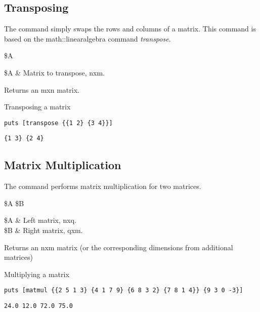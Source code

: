 \documentclass{article}
\begin{document}
\subsection{Transposing}
The command  simply swaps the rows and columns of a matrix. This command is based on the math::linearalgebra command \textit{transpose}.
\begin{syntax}
 \$A
\end{syntax}
\begin{args}
\$A & Matrix to transpose, nxm.
\end{args}
Returns an mxn matrix.
\begin{example}{Transposing a matrix}
\begin{lstlisting}
puts [transpose {{1 2} {3 4}}]
\end{lstlisting}
\tcblower
\begin{lstlisting}
{1 3} {2 4}
\end{lstlisting}
\end{example}

\subsection{Matrix Multiplication}
The command  performs matrix multiplication for two matrices.
\begin{syntax}
 \$A \$B
\end{syntax}
\begin{args}
\$A & Left matrix, nxq. \\
\$B & Right matrix, qxm. 
\end{args}
Returns an nxm matrix (or the corresponding dimensions from additional matrices)
\begin{example}{Multiplying a matrix}
\begin{lstlisting}
puts [matmul {{2 5 1 3} {4 1 7 9} {6 8 3 2} {7 8 1 4}} {9 3 0 -3}]
\end{lstlisting}
\tcblower
\begin{lstlisting}
24.0 12.0 72.0 75.0
\end{lstlisting}
\end{example}

\clearpage
{\normalsize\printindex}
\end{document}
